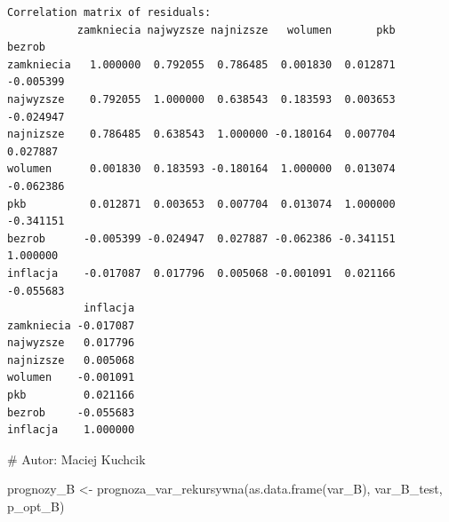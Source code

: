 \documentclass[
  polish,
  letterpaper,
  DIV=11,
  numbers=noendperiod]{scrartcl}
\newenvironment{Shaded}{\begin{snugshade}}{\end{snugshade}}
\newcommand{\AttributeTok}[1]{\textcolor[rgb]{0.40,0.45,0.13}{#1}}
\newcommand{\CommentTok}[1]{\textcolor[rgb]{0.37,0.37,0.37}{#1}}
\newcommand{\DecValTok}[1]{\textcolor[rgb]{0.68,0.00,0.00}{#1}}
\newcommand{\FunctionTok}[1]{\textcolor[rgb]{0.28,0.35,0.67}{#1}}
\newcommand{\NormalTok}[1]{\textcolor[rgb]{0.00,0.23,0.31}{#1}}
\newcommand{\OtherTok}[1]{\textcolor[rgb]{0.00,0.23,0.31}{#1}}
\newcommand{\SpecialCharTok}[1]{\textcolor[rgb]{0.37,0.37,0.37}{#1}}
\newcommand{\StringTok}[1]{\textcolor[rgb]{0.13,0.47,0.30}{#1}}
\begin{document}
\begin{verbatim}
Correlation matrix of residuals:
           zamkniecia najwyzsze najnizsze   wolumen       pkb    bezrob
zamkniecia   1.000000  0.792055  0.786485  0.001830  0.012871 -0.005399
najwyzsze    0.792055  1.000000  0.638543  0.183593  0.003653 -0.024947
najnizsze    0.786485  0.638543  1.000000 -0.180164  0.007704  0.027887
wolumen      0.001830  0.183593 -0.180164  1.000000  0.013074 -0.062386
pkb          0.012871  0.003653  0.007704  0.013074  1.000000 -0.341151
bezrob      -0.005399 -0.024947  0.027887 -0.062386 -0.341151  1.000000
inflacja    -0.017087  0.017796  0.005068 -0.001091  0.021166 -0.055683
            inflacja
zamkniecia -0.017087
najwyzsze   0.017796
najnizsze   0.005068
wolumen    -0.001091
pkb         0.021166
bezrob     -0.055683
inflacja    1.000000
\end{verbatim}

\begin{Shaded}
\begin{Highlighting}[]
\CommentTok{\# Autor: Maciej Kuchcik}

\NormalTok{prognozy\_B }\OtherTok{\textless{}{-}} \FunctionTok{prognoza\_var\_rekursywna}\NormalTok{(}\FunctionTok{as.data.frame}\NormalTok{(var\_B), var\_B\_test, p\_opt\_B)}
\end{Highlighting}
\end{Shaded}

\begin{Shaded}
\end{Shaded}
\end{document}
